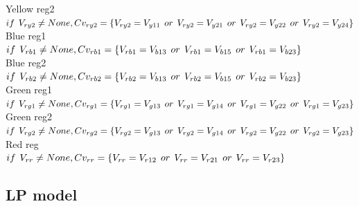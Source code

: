 \\ Yellow reg2 
\\$if\hspace{1ex} V_{ry2} \neq None, Cv_{ry2}= \{V_{ry2}=V_{y11} \hspace{1ex} or \hspace{1ex} V_{ry2}=V_{y21} \hspace{1ex} or \hspace{1ex} V_{ry2}=V_{y22} \hspace{1ex} or\hspace{1ex} V_{ry2}=V_{y24} \}$
\\ Blue reg1 
\\$if\hspace{1ex} V_{rb1} \neq None, Cv_{rb1}= \{V_{rb1}=V_{b13} \hspace{1ex} or \hspace{1ex} V_{rb1}=V_{b15} \hspace{1ex} or\hspace{1ex} 
V_{rb1}=V_{b23}\}$
\\ Blue reg2 
\\$if \hspace{1ex}V_{rb2} \neq None, Cv_{rb2}= \{V_{rb2}=V_{b13} \hspace{1ex} or\hspace{1ex}  V_{rb2}=V_{b15} \hspace{1ex} or\hspace{1ex} 
V_{rb2}=V_{b23}\}$
\\ Green reg1 
\\$if\hspace{1ex} V_{rg1} \neq None, Cv_{rg1}= \{V_{rg1}=V_{g13} \hspace{1ex} or\hspace{1ex}  V_{rg1}=V_{g14} \hspace{1ex} or\hspace{1ex} 
V_{rg1}=V_{g22} \hspace{1ex} or\hspace{1ex}  V_{rg1}=V_{g23}\}$
\\ Green reg2 
\\$if \hspace{1ex}V_{rg2} \neq None, Cv_{rg2}= \{V_{rg2}=V_{g13} \hspace{1ex} or\hspace{1ex}  V_{rg2}=V_{g14} \hspace{1ex} or\hspace{1ex} 
V_{rg2}=V_{g22} \hspace{1ex} or\hspace{1ex}  V_{rg2}=V_{g23}\}$
\\ Red reg 
\\$if\hspace{1ex} V_{rr} \neq None, Cv_{rr}= \{V_{rr}=V_{r12} \hspace{1ex} or\hspace{1ex}  V_{rr}=V_{r21} \hspace{1ex} or\hspace{1ex}  V_{rr}=V_{r23}\}$
\subsection{LP model}
\label{sec:LP model}

